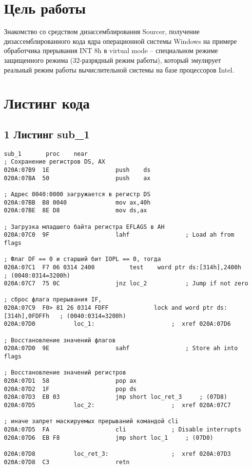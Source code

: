\setcounter{page}{2}
\section*{Цель работы}

Знакомство со средством дизассемблирования Sourcer, получение дизассемблированного кода ядра операционной системы Windows на примере обработчика прерывания INT 8h в virtual mode – специальном режиме защищенного режима (32-разрядный режим работы), который эмулирует реальный режим работы  вычислительной системы на базе процессоров Intel.

\clearpage

\section*{Листинг кода}

\subsection*{1 Листинг sub\_1} 
\begin{lstlisting}[style={asm}]
    sub_1       proc    near
; Сохранение регистров DS, AX
020A:07B9  1E					push	ds
020A:07BA  50					push	ax

; Адрес 0040:0000 загружается в регистр DS
020A:07BB  B8 0040				mov	ax,40h
020A:07BE  8E D8				mov	ds,ax

; Загрузка младшего байта регистра EFLAGS в AH
020A:07C0  9F					lahf				; Load ah from flags

; Флаг DF == 0 и старший бит IOPL == 0, тогда 
020A:07C1  F7 06 0314 2400			test	word ptr ds:[314h],2400h	; (0040:0314=3200h)
020A:07C7  75 0C				jnz	loc_2			; Jump if not zero

; сброс флага прерывания IF,
020A:07C9  F0> 81 26 0314 FDFF	           lock	and	word ptr ds:[314h],0FDFFh	; (0040:0314=3200h)
020A:07D0			loc_1:						;  xref 020A:07D6

; Восстановление значений флагов
020A:07D0  9E					sahf				; Store ah into flags

; Восстановление значений регистров
020A:07D1  58					pop	ax
020A:07D2  1F					pop	ds
020A:07D3  EB 03				jmp	short loc_ret_3		; (07D8)
020A:07D5			loc_2:						;  xref 020A:07C7

; иначе запрет маскируемых прерываний командой cli
020A:07D5  FA					cli				; Disable interrupts
020A:07D6  EB F8				jmp	short loc_1		; (07D0)
    
020A:07D8			loc_ret_3:					;  xref 020A:07D3
020A:07D8  C3					retn
\end{lstlisting}


